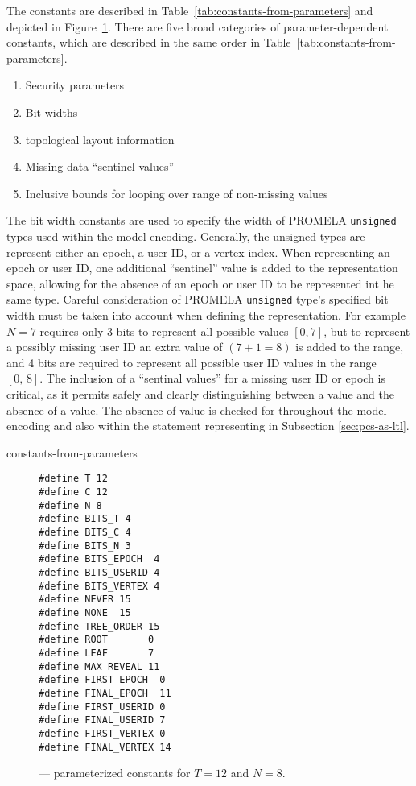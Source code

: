 The constants are described in Table\ \ref{tab:constants-from-parameters} and depicted in Figure\ \ref{fig:Encoded-Constants}.
There are five broad categories of parameter-dependent constants, which are described in the same order in Table\ \ref{tab:constants-from-parameters}.

\begin{enumerate}
\item Security parameters
\item Bit widths
\item {} topological layout information
\item Missing data ``sentinel values''
\item Inclusive bounds for looping over range of non-missing values
\end{enumerate}

The bit width constants are used to specify the width of PROMELA \texttt{unsigned} types used within the model encoding.
Generally, the unsigned types are represent either an epoch, a user ID, or a  vertex index.
When representing an epoch or user ID, one additional ``sentinel'' value is added to the representation space, allowing for the absence of an epoch or user ID to be represented int he same type.
Careful consideration of PROMELA \texttt{unsigned} type's specified bit width must be taken into account when defining the representation.
For example \(N=7\) requires only 3 bits to represent all possible values \([0,7]\), but to represent a possibly missing user ID an extra value of \((7 + 1 = 8)\) is added to the range, and 4 bits are required to represent all possible user ID values in the range \([0,\, 8]\).
The inclusion of a ``sentinal values'' for a missing user ID or epoch is critical, as it permits safely and clearly distinguishing between a value and the absence of a value.
The absence of value is checked for throughout the model encoding and also within the  statement representing  in Subsection \ref{sec:pcs-as-ltl}.

\begin{table}[ht!]
\centering
\caption{%
\label{tab:constants-from-parameters}%
Derivation constants in  model from parameters\(T\) and \(N\).
}%
{constants-from-parameters}
\end{table}
    
\begin{figure}[ht!]
  \centering
  \caption{\label{fig:Encoded-Constants}\CGKAmod{}{}{} --- parameterized constants for \(T=12\) and \(N=8\).}
\begin{verbatim}
#define T 12
#define C 12
#define N 8
#define BITS_T 4
#define BITS_C 4
#define BITS_N 3
#define BITS_EPOCH  4
#define BITS_USERID 4
#define BITS_VERTEX 4
#define NEVER 15
#define NONE  15
#define TREE_ORDER 15
#define ROOT       0
#define LEAF       7
#define MAX_REVEAL 11
#define FIRST_EPOCH  0
#define FINAL_EPOCH  11
#define FIRST_USERID 0
#define FINAL_USERID 7
#define FIRST_VERTEX 0
#define FINAL_VERTEX 14
\end{verbatim}
\end{figure}

